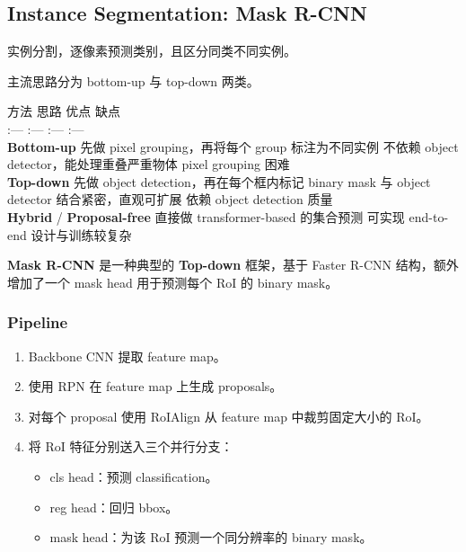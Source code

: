 \subsection{Instance Segmentation: Mask
R-CNN}\label{instance-segmentation-mask-r-cnn}

实例分割，逐像素预测类别，且区分同类不同实例。

主流思路分为 bottom-up 与 top-down 两类。

方法 \textbar{} 思路 \textbar{} 优点 \textbar{} 缺点 \textbar{}\\
:--- \textbar{} :--- \textbar{} :--- \textbar{} :--- \textbar{}\\
\textbf{Bottom-up} \textbar{} 先做 pixel grouping，再将每个 group
标注为不同实例 \textbar{} 不依赖 object detector，能处理重叠严重物体
\textbar{} pixel grouping 困难 \textbar{}\\
\textbf{Top-down} \textbar{} 先做 object detection，再在每个框内标记
binary mask \textbar{} 与 object detector 结合紧密，直观可扩展
\textbar{} 依赖 object detection 质量 \textbar{}\\
\textbf{Hybrid} / \textbf{Proposal-free} \textbar{} 直接做
transformer-based 的集合预测 \textbar{} 可实现 end-to-end \textbar{}
设计与训练较复杂 \textbar{}

\textbf{Mask R-CNN} 是一种典型的 \textbf{Top-down} 框架，基于 Faster
R-CNN 结构，额外增加了一个 mask head 用于预测每个 RoI 的 binary mask。

\subsubsection{Pipeline}\label{pipeline}

\begin{enumerate}
\def\labelenumi{\arabic{enumi}.}
\tightlist
\item
  Backbone CNN 提取 feature map。
\item
  使用 RPN 在 feature map 上生成 proposals。
\item
  对每个 proposal 使用 RoIAlign 从 feature map 中裁剪固定大小的 RoI。
\item
  将 RoI 特征分别送入三个并行分支：

  \begin{itemize}
  \tightlist
  \item
    cls head：预测 classification。
  \item
    reg head：回归 bbox。
  \item
    mask head：为该 RoI 预测一个同分辨率的 binary mask。
  \end{itemize}
\end{enumerate}

